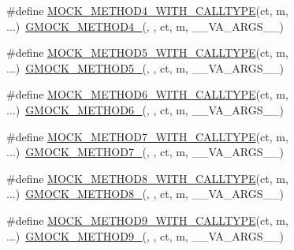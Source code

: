 \begin{DoxyCompactItemize}
\item 
\#define \mbox{\hyperlink{gmock-generated-function-mockers_8h_a333774e6dda450fc85c241bff4b9957a}{M\+O\+C\+K\+\_\+\+M\+E\+T\+H\+O\+D4\+\_\+\+W\+I\+T\+H\+\_\+\+C\+A\+L\+L\+T\+Y\+PE}}(ct,  m, ...)~\mbox{\hyperlink{gmock-generated-function-mockers_8h_ab6430f2cfad9de4aca5258ea559294bb}{G\+M\+O\+C\+K\+\_\+\+M\+E\+T\+H\+O\+D4\+\_\+}}(, , ct, m, \+\_\+\+\_\+\+V\+A\+\_\+\+A\+R\+G\+S\+\_\+\+\_\+)
\item 
\#define \mbox{\hyperlink{gmock-generated-function-mockers_8h_a195de665a5ab83cf56ac9562ccc73838}{M\+O\+C\+K\+\_\+\+M\+E\+T\+H\+O\+D5\+\_\+\+W\+I\+T\+H\+\_\+\+C\+A\+L\+L\+T\+Y\+PE}}(ct,  m, ...)~\mbox{\hyperlink{gmock-generated-function-mockers_8h_a9e3ecd392499ab19a4a6d3adcabf56f6}{G\+M\+O\+C\+K\+\_\+\+M\+E\+T\+H\+O\+D5\+\_\+}}(, , ct, m, \+\_\+\+\_\+\+V\+A\+\_\+\+A\+R\+G\+S\+\_\+\+\_\+)
\item 
\#define \mbox{\hyperlink{gmock-generated-function-mockers_8h_a1e55bb6ae5cfcb0403c867541f5f0931}{M\+O\+C\+K\+\_\+\+M\+E\+T\+H\+O\+D6\+\_\+\+W\+I\+T\+H\+\_\+\+C\+A\+L\+L\+T\+Y\+PE}}(ct,  m, ...)~\mbox{\hyperlink{gmock-generated-function-mockers_8h_ad0ca7f6973a076d0af4c953f8ed91842}{G\+M\+O\+C\+K\+\_\+\+M\+E\+T\+H\+O\+D6\+\_\+}}(, , ct, m, \+\_\+\+\_\+\+V\+A\+\_\+\+A\+R\+G\+S\+\_\+\+\_\+)
\item 
\#define \mbox{\hyperlink{gmock-generated-function-mockers_8h_a696e2f91735b99b2a37c369a74bad647}{M\+O\+C\+K\+\_\+\+M\+E\+T\+H\+O\+D7\+\_\+\+W\+I\+T\+H\+\_\+\+C\+A\+L\+L\+T\+Y\+PE}}(ct,  m, ...)~\mbox{\hyperlink{gmock-generated-function-mockers_8h_ab98a8399ba62b53b375c2807f4d39d2f}{G\+M\+O\+C\+K\+\_\+\+M\+E\+T\+H\+O\+D7\+\_\+}}(, , ct, m, \+\_\+\+\_\+\+V\+A\+\_\+\+A\+R\+G\+S\+\_\+\+\_\+)
\item 
\#define \mbox{\hyperlink{gmock-generated-function-mockers_8h_a5d207db39768c12d6fecab03cfbe4d75}{M\+O\+C\+K\+\_\+\+M\+E\+T\+H\+O\+D8\+\_\+\+W\+I\+T\+H\+\_\+\+C\+A\+L\+L\+T\+Y\+PE}}(ct,  m, ...)~\mbox{\hyperlink{gmock-generated-function-mockers_8h_aa84a36427c44505207b7cad5dec7ad67}{G\+M\+O\+C\+K\+\_\+\+M\+E\+T\+H\+O\+D8\+\_\+}}(, , ct, m, \+\_\+\+\_\+\+V\+A\+\_\+\+A\+R\+G\+S\+\_\+\+\_\+)
\item 
\#define \mbox{\hyperlink{gmock-generated-function-mockers_8h_a38494187d78c6a395f78c074d204f593}{M\+O\+C\+K\+\_\+\+M\+E\+T\+H\+O\+D9\+\_\+\+W\+I\+T\+H\+\_\+\+C\+A\+L\+L\+T\+Y\+PE}}(ct,  m, ...)~\mbox{\hyperlink{gmock-generated-function-mockers_8h_aa820171a19cc587c247dbe05cbffc55f}{G\+M\+O\+C\+K\+\_\+\+M\+E\+T\+H\+O\+D9\+\_\+}}(, , ct, m, \+\_\+\+\_\+\+V\+A\+\_\+\+A\+R\+G\+S\+\_\+\+\_\+)

\end{DoxyCompactItemize}
